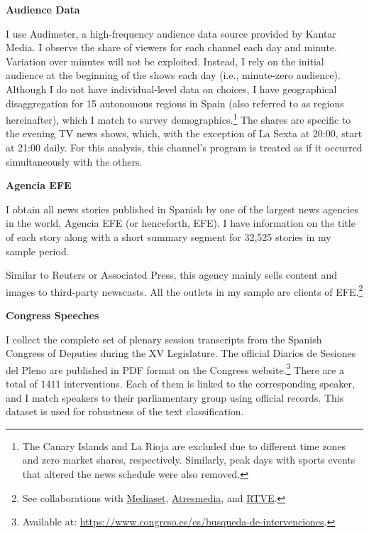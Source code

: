 \documentclass[12pt]{article}
\begin{document}
	
	\textbf{Audience Data}
	
	I use Audimeter, a high-frequency audience data source provided by Kantar Media. I observe the share of viewers for each channel  each day and minute. Variation over minutes will not be exploited. Instead, I rely on the initial audience at the beginning of the shows each day (i.e., minute-zero audience).
	Although I do not have individual-level data on choices, I have geographical disaggregation for 15 autonomous regions in Spain (also referred to as regions hereinafter), which I match to survey demographics.\footnote{The Canary Islands and La Rioja are excluded due to different time zones and zero market shares, respectively. Similarly, peak days with sports events that altered the news schedule were also removed.} The shares are specific to the evening TV news shows, which, with the exception of La Sexta at 20:00, start at 21:00 daily. For this analysis, this channel’s program is treated as if it occurred simultaneously with the others.
	
	
	
	
	\textbf{Agencia EFE}
	
	I obtain all news stories published in Spanish by one of the largest news agencies in the world, Agencia EFE (or henceforth, EFE). I have information on the title of each story along with a short summary segment for  32,525 stories in my sample period.
	
	Similar to Reuters or Associated Press, this agency mainly sells content and images to third-party newscasts. All the outlets in my sample are clients of  EFE.\footnote{See collaborations with \href{https://www.telecinco.es/autores/agencia-efe/}{Mediaset}, \href{https://cadenaser.com/nacional/2024/09/22/el-teletexto-una-herramienta-olvidada-que-aun-perdura-en-nuestras-televisiones-cadena-ser/}{Atresmedia}, and \href{https://www.rtve.es/rtve/20130301/rtve-agencia-efe-firman-convenio-colaboracion/611440.shtml}{RTVE}.} 
	
	
	\textbf{Congress Speeches}
	
	I collect the complete set of plenary session transcripts from the Spanish Congress of Deputies during the XV Legislature. The official Diarios de Sesiones del Pleno are published in PDF format on the Congress website.\footnote{Available at: \url{https://www.congreso.es/es/busqueda-de-intervenciones}.} There are a total of $1411$ interventions. Each of them is linked to the corresponding speaker, and I match speakers to their parliamentary group using official records. This dataset is used for robustness of the text classification. 
	
\end{document}
